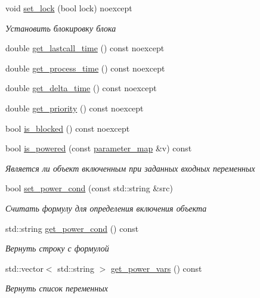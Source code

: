 \begin{DoxyCompactItemize}
void \hyperlink{classLIBKMS__namespace_1_1Callable_ad07f298a0831bc06851159003426e199}{set\-\_\-lock} (bool lock) noexcept
\begin{DoxyCompactList}\small\item\em Установить блокировку блока \end{DoxyCompactList}\item 
double \hyperlink{classLIBKMS__namespace_1_1Callable_a43d1d9a56ec6a20d3e47a756a4dea6b2}{get\-\_\-lastcall\-\_\-time} () const noexcept
\item 
double \hyperlink{classLIBKMS__namespace_1_1Callable_aa2668a9d0ec66e3dab36450f3b7c6c5f}{get\-\_\-process\-\_\-time} () const noexcept
\item 
double \hyperlink{classLIBKMS__namespace_1_1Callable_a592eba396f24ff83ce9444027c116d9b}{get\-\_\-delta\-\_\-time} () const noexcept
\item 
double \hyperlink{classLIBKMS__namespace_1_1Callable_afc4d97e5407815e621065af7ce8566d6}{get\-\_\-priority} () const noexcept
\item 
bool \hyperlink{classLIBKMS__namespace_1_1Callable_a7585ce4ee8b17e0a45f40acf784d0229}{is\-\_\-blocked} () const noexcept
\item 
bool \hyperlink{classLIBKMS__namespace_1_1Callable_a07e942cddded27a2b1a7b8eb735904a7}{is\-\_\-powered} (const \hyperlink{classLIBKMS__namespace_1_1Callable_ad58caabaa5ac247c9d385e6d5451916a}{parameter\-\_\-map} \&v) const 
\begin{DoxyCompactList}\small\item\em Является ли объект включенным при заданных входных переменных \end{DoxyCompactList}\item 
bool \hyperlink{classLIBKMS__namespace_1_1Callable_a69c7569651e285a161b243daeca7b2a5}{set\-\_\-power\-\_\-cond} (const std\-::string \&src)
\begin{DoxyCompactList}\small\item\em Считать формулу для определения включения объекта \end{DoxyCompactList}\item 
std\-::string \hyperlink{classLIBKMS__namespace_1_1Callable_a1b5d88ad33daaf0df7168fc125bfda98}{get\-\_\-power\-\_\-cond} () const 
\begin{DoxyCompactList}\small\item\em Вернуть строку с формулой \end{DoxyCompactList}\item 
std\-::vector$<$ std\-::string $>$ \hyperlink{classLIBKMS__namespace_1_1Callable_a3140c543709c0541fee7ef0a6ec23e15}{get\-\_\-power\-\_\-vars} () const 
\begin{DoxyCompactList}\small\item\em Вернуть список переменных \end{DoxyCompactList}\end{DoxyCompactItemize}
